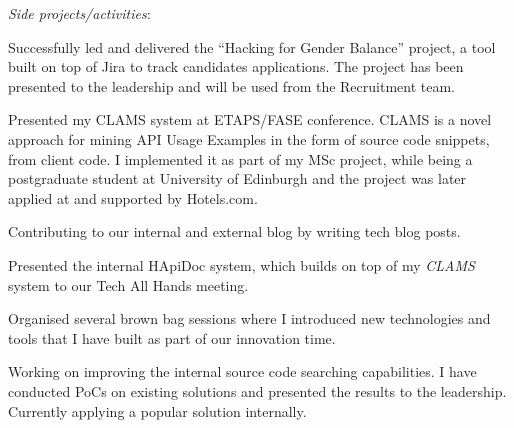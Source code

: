 \begin{cventries}
{\begin{cvitems}
       \end{cvitems}
       \vspace{15pt}
       \textit{Side projects/activities}:
       \vspace{12pt}
       \begin{cvitems}
         \item {Successfully led and delivered the ``Hacking for Gender Balance'' project, a tool built on top of Jira to track candidates applications. The project has been presented to the leadership and will be used from the Recruitment team.}
         \item{Presented my CLAMS system at ETAPS/FASE conference. CLAMS is a novel approach for mining API Usage Examples in the form of source code snippets, from client code. I implemented it as part of my MSc project, while being a postgraduate student at University of Edinburgh and the project was later applied at and supported  by Hotels.com.}
		\item {Contributing to our internal and external blog by writing tech blog posts.}
		\item{Presented the internal HApiDoc system, which builds on top of my \textit{CLAMS} system to our Tech All Hands meeting.}
        \item{Organised several brown bag sessions where I introduced new technologies and tools that I have built as part of our innovation time.}
         \item{Working on improving the internal source code searching capabilities. I have conducted PoCs on existing solutions and presented the results to the leadership. Currently applying a popular solution internally.}
      \end{cvitems}
    }


\end{cventries}

